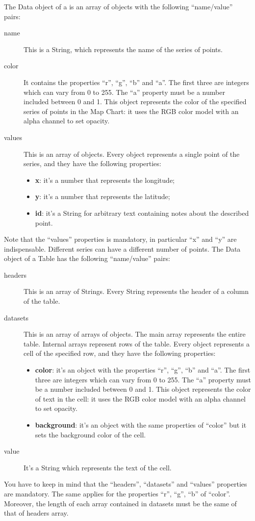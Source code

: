			The Data object of a  is an array of objects with the following “name/value” pairs:
			\begin{description}
				\item[name] This is a String, which represents the name of the series of points.
				\item[color] It contains the properties “r”, “g”, “b” and “a”. The first three are integers which can vary from 0 to 255. The “a” property must be a number included between 0 and 1. This object represents the color of the specified series of points in the Map Chart: it uses the RGB color model with an alpha channel to set opacity.
				\item[values] This is an array of objects. Every object represents a single point of the series, and they have the following properties:
					\begin{itemize}
						\item \textbf{x}: it's a number that represents the longitude;
						\item \textbf{y}: it's a number that represents the latitude;
						\item \textbf{id}: it's a String for arbitrary text containing notes about the described point.
					\end{itemize}
			\end{description}
			Note that the “values” properties is mandatory, in particular “x” and “y” are indispensable. Different series can have a different number of points.
			The Data object of a Table has the following “name/value” pairs:
			\begin{description}
				\item[headers] This is an array of Strings. Every String represents the header of a column of the table.
				\item[datasets] This is an array of arrays of objects. The main array represents the entire table. Internal arrays represent rows of the table. Every object represents a cell of the specified row, and they have the following properties:
				\begin{itemize}
					\item \textbf{color}: it's an object with the properties “r”, “g”, “b” and “a”. The first three are integers which can vary from 0 to 255. The “a” property must be a number included between 0 and 1.
					This object represents the color of text in the cell: it uses the RGB color model with an alpha channel to set opacity.
					\item \textbf{background}: it's an object with the same properties of “color” but it sets the background color of the cell.
				\end{itemize}
				\item[value] It's a String which represents the text of the cell.
			\end{description}
			You have to keep in mind that the “headers”, “datasets” and “values” properties are mandatory. The same applies for the properties “r”, “g”, “b” of “color”. Moreover, the length of each array contained in datasets must be the same of that of headers array.

